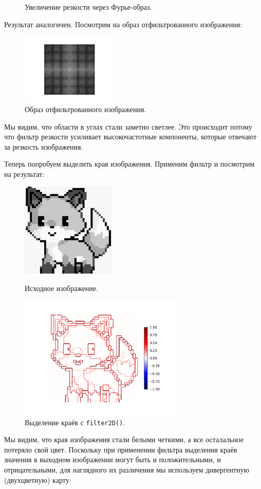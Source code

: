 \documentclass[a4paper]{article}
\begin{document}
\begin{figure}[H]
\begin{minipage}{0.49\textwidth}
    \caption{Увеличение резкости через Фурье-образ.}
  \end{minipage}
\end{figure}

\noindent Результат аналогичен. Посмотрим на образ отфильтрованного изображения:
\begin{figure}[H]
  \centering
  \includegraphics[width=0.4\textwidth]{src/ifft_spec_sharpen.png}
  \caption{Образ отфильтрованного изображения.}
\end{figure}

\noindent Мы видим, что области в углах стали заметно светлее. Это происходит потому что фильтр резкости усиливает высокочастотные компоненты, которые отвечают за резкость изображения.

Теперь попробуем выделить края изображения. Применим фильтр и посмотрим на результат:
\begin{figure}[H]
  \centering
  \includegraphics[width=0.4\textwidth]{src/grayscale.png}
  \caption{Исходное изображение.}  
  \includegraphics[width=0.7\textwidth]{src/edge.png}
  \caption{Выделение краёв с \texttt{filter2D()}.}
\end{figure}
\noindent Мы видим, что края изображения стали белыми четкими, а все осталальное потеряло свой цвет. Поскольку при применении фильтра выделения краёв значения в выходном изображении могут быть и положительными, и отрицательными, для наглядного их различения мы используем дивергентную (двухцветную) карту:
\end{document}

